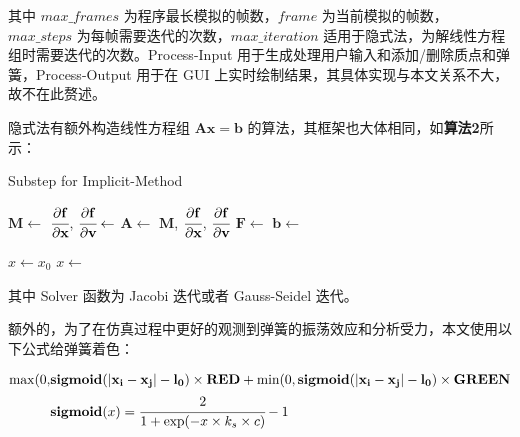 \documentclass[UTF8]{ctexart}
\begin{document}
其中 $max\_frames$ 为程序最长模拟的帧数，$frame$ 为当前模拟的帧数，$max\_steps$ 为每帧需要迭代的次数，$max\_iteration$ 适用于隐式法，为解线性方程组时需要迭代的次数。Process-Input 用于生成处理用户输入和添加/删除质点和弹簧，Process-Output 用于在 GUI 上实时绘制结果，其具体实现与本文关系不大，故不在此赘述。 \par

隐式法有额外构造线性方程组 $\mathbf{Ax=b}$ 的算法，其框架也大体相同，如\textbf{算法2}所示：

\begin{algorithm}
\caption{Substep for Implicit-Method}  
\label{alg: Substep for Implicit-Method} 
\begin{algorithmic} [1] 
		\State $\mathbf{M} \gets $ 
		\State $\cfrac{\partial \mathbf{f}}{\partial \mathbf{x}}$, $\cfrac{\partial \mathbf{f}}{\partial \mathbf{v}} \gets $  
		\State $\mathbf{A} \gets $  {$\mathbf{M}$, $\cfrac{\partial \mathbf{f}}{\partial \mathbf{x}}$, $\cfrac{\partial \mathbf{f}}{\partial \mathbf{v}}$}
		\State $\mathbf{F} \gets $ 
		\State $\mathbf{b} \gets $ 
		
		\State $x \gets x_{0}$
			\State $x \gets $ 
		\EndFor

	\State {}
	\EndFunction  

\end{algorithmic}
\end{algorithm}

其中 Solver 函数为 Jacobi 迭代或者 Gauss-Seidel 迭代。 \par

额外的，为了在仿真过程中更好的观测到弹簧的振荡效应和分析受力，本文使用以下公式给弹簧着色：

\begin{large}
\begin{equation}
\begin{split}
\max(0, &\mathbf{sigmoid(\lvert \mathbf{x}_i - \mathbf{x}_j \rvert - l_0}) \times \mathbf{RED} + \min(0, \mathbf{sigmoid(\lvert \mathbf{x}_i - \mathbf{x}_j \rvert - l_0}) \times \mathbf{GREEN} \\
&\mathbf{sigmoid}(x) = \cfrac{2}{1 + \exp(-x \times k_s \times c)} - 1
\end{split}
\end{equation}
\end{large}
\end{document}
